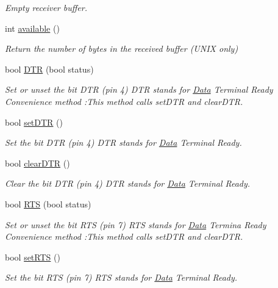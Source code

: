 \begin{DoxyCompactItemize}
\begin{DoxyCompactList}\small\item\em Empty receiver buffer. \end{DoxyCompactList}\item 
int \hyperlink{classserialib_a50c91bf8cab23afdfdf05ca58392456f}{available} ()
\begin{DoxyCompactList}\small\item\em Return the number of bytes in the received buffer (U\+N\+IX only) \end{DoxyCompactList}\item 
bool \hyperlink{classserialib_a3dc0ec56e84ab2b43dc02fc2e02148a1}{D\+TR} (bool status)
\begin{DoxyCompactList}\small\item\em Set or unset the bit D\+TR (pin 4) D\+TR stands for \hyperlink{classData}{Data} Terminal Ready Convenience method \+:This method calls set\+D\+TR and clear\+D\+TR. \end{DoxyCompactList}\item 
bool \hyperlink{classserialib_a7564b9e28b1b50675d9d6d3fabc896c0}{set\+D\+TR} ()
\begin{DoxyCompactList}\small\item\em Set the bit D\+TR (pin 4) D\+TR stands for \hyperlink{classData}{Data} Terminal Ready. \end{DoxyCompactList}\item 
bool \hyperlink{classserialib_adf49bff6401d3101b41fb52e98309635}{clear\+D\+TR} ()
\begin{DoxyCompactList}\small\item\em Clear the bit D\+TR (pin 4) D\+TR stands for \hyperlink{classData}{Data} Terminal Ready. \end{DoxyCompactList}\item 
bool \hyperlink{classserialib_a5a73f159762fa4d5c252f36acfe7ab47}{R\+TS} (bool status)
\begin{DoxyCompactList}\small\item\em Set or unset the bit R\+TS (pin 7) R\+TS stands for \hyperlink{classData}{Data} Termina Ready Convenience method \+:This method calls set\+D\+TR and clear\+D\+TR. \end{DoxyCompactList}\item 
bool \hyperlink{classserialib_a21767ffe86a76f300a71c496fbcc26a1}{set\+R\+TS} ()
\begin{DoxyCompactList}\small\item\em Set the bit R\+TS (pin 7) R\+TS stands for \hyperlink{classData}{Data} Terminal Ready. \end{DoxyCompactList}\item 

\end{DoxyCompactItemize}

